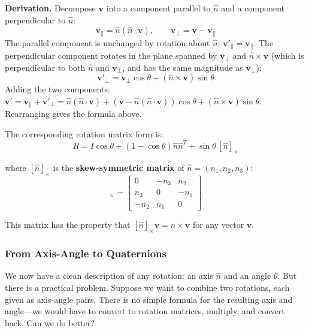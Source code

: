 \textbf{Derivation.} Decompose $\mathbf{v}$ into a component parallel to $\hat{n}$ and a component perpendicular to $\hat{n}$:
\[
\mathbf{v}_\parallel = \hat{n}(\hat{n} \cdot \mathbf{v}), \qquad \mathbf{v}_\perp = \mathbf{v} - \mathbf{v}_\parallel
\]
The parallel component is unchanged by rotation about $\hat{n}$: $\mathbf{v}'_\parallel = \mathbf{v}_\parallel$. The perpendicular component rotates in the plane spanned by $\mathbf{v}_\perp$ and $\hat{n} \times \mathbf{v}$ (which is perpendicular to both $\hat{n}$ and $\mathbf{v}_\perp$, and has the same magnitude as $\mathbf{v}_\perp$):
\[
\mathbf{v}'_\perp = \mathbf{v}_\perp \cos\theta + (\hat{n} \times \mathbf{v}) \sin\theta
\]
Adding the two components: $\mathbf{v}' = \mathbf{v}_\parallel + \mathbf{v}'_\perp = \hat{n}(\hat{n} \cdot \mathbf{v}) + (\mathbf{v} - \hat{n}(\hat{n} \cdot \mathbf{v}))\cos\theta + (\hat{n} \times \mathbf{v})\sin\theta$. Rearranging gives the formula above.

The corresponding rotation matrix form is:
\begin{equation}
R = I \cos\theta + (1 - \cos\theta) \hat{n}\hat{n}^T + \sin\theta \, [\hat{n}]_\times
\end{equation}

where $[\hat{n}]_\times$ is the \textbf{skew-symmetric matrix} of $\hat{n} = (n_1, n_2, n_3)$:
\begin{equation}
[\hat{n}]_\times = \begin{bmatrix} 0 & -n_3 & n_2 \\ n_3 & 0 & -n_1 \\ -n_2 & n_1 & 0 \end{bmatrix}
\end{equation}

This matrix has the property that $[\hat{n}]_\times \mathbf{v} = \hat{n} \times \mathbf{v}$ for any vector $\mathbf{v}$.

\subsubsection{From Axis-Angle to Quaternions}

We now have a clean description of any rotation: an axis $\hat{n}$ and an angle $\theta$. But there is a practical problem. Suppose we want to combine two rotations, each given as axis-angle pairs. There is no simple formula for the resulting axis and angle---we would have to convert to rotation matrices, multiply, and convert back. Can we do better?

